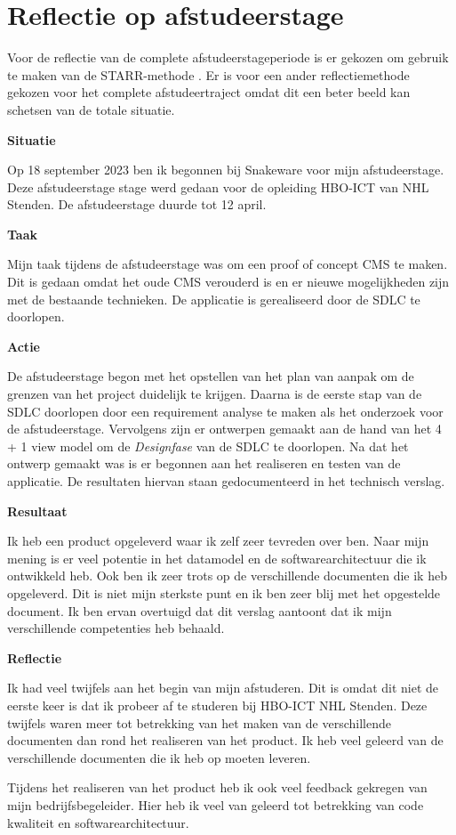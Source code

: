 \section{Reflectie op afstudeerstage}
Voor de reflectie van de complete afstudeerstageperiode is er gekozen om gebruik te maken van de STARR-methode \parencite{STARR}.
Er is voor een ander reflectiemethode gekozen voor het complete afstudeertraject omdat dit een beter beeld kan schetsen van de totale situatie.

\whitespace
\textbf{Situatie}

\whitespace
Op 18 september 2023 ben ik begonnen bij Snakeware voor mijn afstudeerstage.
Deze afstudeerstage stage werd gedaan voor de opleiding HBO-ICT van NHL Stenden.
De afstudeerstage duurde tot 12 april.

\whitespace
\textbf{Taak}

\whitespace
Mijn taak tijdens de afstudeerstage was om een proof of concept \gls{CMS} te maken.
Dit is gedaan omdat het oude CMS verouderd is en er nieuwe mogelijkheden zijn met de bestaande technieken.
De applicatie is gerealiseerd door de \gls{SDLC} te doorlopen.

\whitespace
\textbf{Actie}

\whitespace
De afstudeerstage begon met het opstellen van het plan van aanpak om de grenzen van het project duidelijk te krijgen.
Daarna is de eerste stap van de \gls{SDLC} doorlopen door een requirement analyse te maken als het onderzoek voor de afstudeerstage.
Vervolgens zijn er ontwerpen gemaakt aan de hand van het 4 + 1 view model om de \textit{Designfase} van de \gls{SDLC} te doorlopen. 
Na dat het ontwerp gemaakt was is er begonnen aan het realiseren en testen van de applicatie.
De resultaten hiervan staan gedocumenteerd in het technisch verslag.

\whitespace
\textbf{Resultaat}

\whitespace
Ik heb een product opgeleverd waar ik zelf zeer tevreden over ben.
Naar mijn mening is er veel potentie in het datamodel en de softwarearchitectuur die ik ontwikkeld heb.
Ook ben ik zeer trots op de verschillende documenten die ik heb opgeleverd.
Dit is niet mijn sterkste punt en ik ben zeer blij met het opgestelde document.
Ik ben ervan overtuigd dat dit verslag aantoont dat ik mijn verschillende competenties heb behaald.

\whitespace
\textbf{Reflectie}

\whitespace
Ik had veel twijfels aan het begin van mijn afstuderen.
Dit is omdat dit niet de eerste keer is dat ik probeer af te studeren bij HBO-ICT NHL Stenden.
Deze twijfels waren meer tot betrekking van het maken van de verschillende documenten dan rond het realiseren van het product.
Ik heb veel geleerd van de verschillende documenten die ik heb op moeten leveren.

\whitespace
Tijdens het realiseren van het product heb ik ook veel feedback gekregen van mijn bedrijfsbegeleider.
Hier heb ik veel van geleerd tot betrekking van code kwaliteit en softwarearchitectuur.
